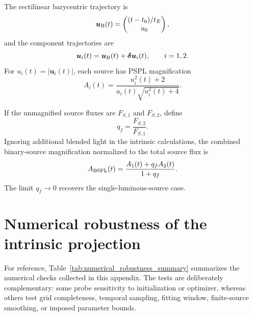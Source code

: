 \documentclass{article}
\begin{document}
The rectilinear barycentric trajectory is
\begin{equation}
\boldsymbol{u}_{\rm B}(t)
=
\begin{pmatrix}
(t-t_0)/t_E\\
u_0
\end{pmatrix},
\end{equation}
and the component trajectories are
\begin{equation}
\boldsymbol{u}_i(t)
=
\boldsymbol{u}_{\rm B}(t)
+
\boldsymbol{\delta u}_i(t),
\qquad i=1,2.
\end{equation}
For $u_i(t)=|\boldsymbol{u}_i(t)|$, each source has PSPL magnification
\begin{equation}
A_i(t)
=
\frac{u_i^2(t)+2}
{u_i(t)\sqrt{u_i^2(t)+4}}.
\end{equation}

If the unmagnified source fluxes are $F_{S,1}$ and $F_{S,2}$, define
\begin{equation}
q_f=\frac{F_{S,2}}{F_{S,1}}.
\end{equation}
Ignoring additional blended light in the intrinsic calculations, the
combined binary-source magnification normalized to the total source flux
is
\begin{equation}
A_{\rm BSPL}(t)
=
\frac{A_1(t)+q_fA_2(t)}{1+q_f}.
\end{equation}
The limit $q_f\rightarrow0$ recovers the single-luminous-source case.




\section{Numerical robustness of the intrinsic projection}
\label{app:numerical_robustness}

For reference, Table~\ref{tab:numerical_robustness_summary} summarizes the
numerical checks collected in this appendix. The tests are deliberately
complementary: some probe sensitivity to initialization or optimizer,
whereas others test grid completeness, temporal sampling, fitting window,
finite-source smoothing, or imposed parameter bounds.
\end{document}
